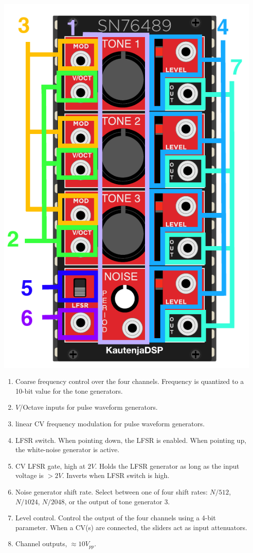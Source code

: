\documentclass[12pt,a4paper]{article}
\begin{document}
\begin{center}
\includegraphics{SN76489-Manual}
\end{center}

\begin{enumerate}
  \item Coarse frequency control over the four channels. Frequency is quantized to a 10-bit value for the tone generators.
  \item $V$/Octave inputs for pulse waveform generators.
  \item linear CV frequency modulation for pulse waveform generators.
  \item LFSR switch. When pointing down, the LFSR is enabled. When pointing up, the white-noise generator is active.
  \item CV LFSR gate, high at $2V$. Holds the LFSR generator as long as the input voltage is $>2V$. Inverts when LFSR switch is high.
  \item Noise generator shift rate. Select between one of four shift rates: $N/512$, $N/1024$, $N/2048$, or the output of tone generator 3.
  \item Level control. Control the output of the four channels using a 4-bit parameter. When a CV(s) are connected, the sliders act as input attenuators.
  \item Channel outputs, ${\approx}10V_{pp}$.
\end{enumerate}


\clearpage
\renewcommand\refname{References \& Acknowledgments}
\nocite{*}


\end{document}
